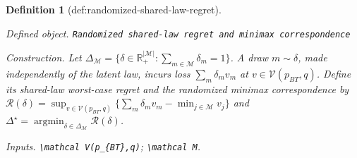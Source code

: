 \documentclass{article}
\newtheorem{definition}{Definition}
\begin{document}
\begin{definition}[def:randomized-shared-law-regret]\label{def:randomized-shared-law-regret}
\par\smallskip\noindent\emph{Defined object.} \texttt{Randomized shared-\allowbreak{}law regret and minimax correspondence}
\par\smallskip\noindent\emph{Construction.} Let \(\Delta_{\mathcal M}=\{\delta\in\mathbb R_+^{|\mathcal M|}:\sum_{m\in\mathcal M}\delta_m=1\}\). A draw \(m\sim\delta\), made independently of the latent law, incurs loss \(\sum_m\delta_m v_m\) at \(v\in\mathcal V(p_{BT},q)\). Define its shared-law worst-case regret and the randomized minimax correspondence by \(\mathcal R(\delta)=\sup_{v\in\mathcal V(p_{BT},q)}\{\sum_m\delta_m v_m-\min_{j\in\mathcal M}v_j\}\) and \(\Delta^\star=\operatorname*{argmin}_{\delta\in\Delta_{\mathcal M}}\mathcal R(\delta)\).
\par\smallskip\noindent\emph{Inputs.} \texttt{\textbackslash{}\allowbreak{}mathcal V(p\_\allowbreak{}\{BT\}\allowbreak{},\allowbreak{}q)}; \texttt{\textbackslash{}\allowbreak{}mathcal M}.
\end{definition}
\end{document}
